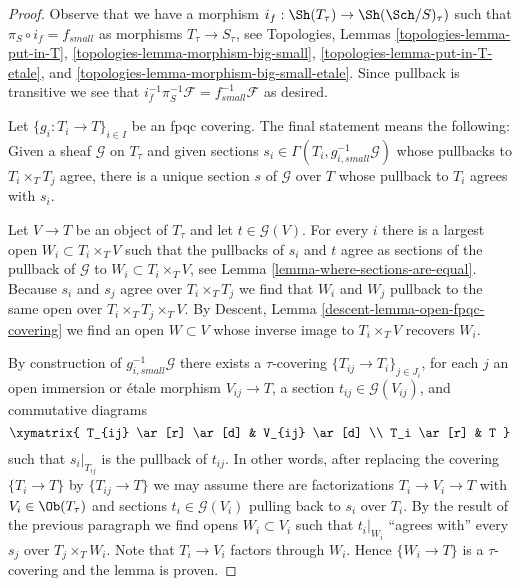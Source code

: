 \begin{proof}
Observe that we have a morphism $i_f : \Sh(T_\tau) \to \Sh(\Sch/S)_\tau)$
such that $\pi_S \circ i_f = f_{small}$ as morphisms
$T_\tau \to S_\tau$, see
Topologies, Lemmas \ref{topologies-lemma-put-in-T},
\ref{topologies-lemma-morphism-big-small},
\ref{topologies-lemma-put-in-T-etale}, and
\ref{topologies-lemma-morphism-big-small-etale}.
Since pullback is transitive we see that
$i_f^{-1} \pi_S^{-1}\mathcal{F} = f_{small}^{-1}\mathcal{F}$ as desired.

\medskip\noindent
Let $\{g_i : T_i \to T\}_{i \in I}$ be an fpqc covering.
The final statement means the following: Given a sheaf $\mathcal{G}$
on $T_\tau$ and given sections
$s_i \in \Gamma(T_i, g_{i, small}^{-1}\mathcal{G})$ whose pullbacks
to $T_i \times_T T_j$ agree, there is a unique section $s$ of $\mathcal{G}$
over $T$ whose pullback to $T_i$ agrees with $s_i$.

\medskip\noindent
Let $V \to T$ be an object of $T_\tau$ and let $t \in \mathcal{G}(V)$.
For every $i$ there is a largest open $W_i \subset T_i \times_T V$
such that the pullbacks of $s_i$ and $t$ agree as sections of the pullback
of $\mathcal{G}$ to $W_i \subset T_i \times_T V$, see
Lemma \ref{lemma-where-sections-are-equal}.
Because $s_i$ and $s_j$ agree over $T_i \times_T T_j$ we find
that $W_i$ and $W_j$ pullback to the same open over
$T_i \times_T T_j \times_T V$. By
Descent, Lemma \ref{descent-lemma-open-fpqc-covering}
we find an open $W \subset V$ whose inverse image to $T_i \times_T V$
recovers $W_i$. 

\medskip\noindent
By construction of $g_{i, small}^{-1}\mathcal{G}$ there exists
a $\tau$-covering $\{T_{ij} \to T_i\}_{j \in J_i}$, for each $j$ an
open immersion or \'etale morphism $V_{ij} \to T$, a section
$t_{ij} \in \mathcal{G}(V_{ij})$, and commutative diagrams
$$
\xymatrix{
T_{ij} \ar[r] \ar[d] & V_{ij} \ar[d] \\
T_i \ar[r] & T
}
$$
such that $s_i|_{T_{ij}}$ is the pullback of $t_{ij}$. In other words,
after replacing the covering $\{T_i \to T\}$ by $\{T_{ij} \to T\}$
we may assume there are factorizations $T_i \to V_i \to T$ with
$V_i \in \Ob(T_\tau)$ and sections $t_i \in \mathcal{G}(V_i)$
pulling back to $s_i$ over $T_i$.
By the result of the previous paragraph we find opens $W_i \subset V_i$
such that $t_i|_{W_i}$ ``agrees with'' every $s_j$ over $T_j \times_T W_i$.
Note that $T_i \to V_i$ factors through $W_i$.
Hence $\{W_i \to T\}$ is a $\tau$-covering and the lemma is proven.
\end{proof}

